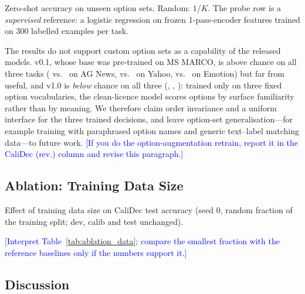 \documentclass[twocolumn]{ICCKjournal}
\newcommand{\revnote}[1]{\textcolor{blue}{[#1]}}
\begin{document}
\begin{table}[H]
\caption{Zero-shot accuracy on unseen option sets. Random: $1/K$. The probe row is a \emph{supervised} reference: a logistic regression on frozen 1-pass-encoder features trained on 300 labelled examples per task.}
\label{tab:custom}
\centering
\small
\begin{adjustbox}{max width=\linewidth}

\end{adjustbox}
\end{table}

The results do not support custom option sets as a capability of the released models. v0.1, whose base was pre-trained on MS MARCO, is above chance on all three tasks (\CustAgnewsVZero{} vs.\ \CustAgnewsRand{} on AG News, \CustYahooVZero{} vs.\ \CustYahooRand{} on Yahoo, \CustEmotionVZero{} vs.\ \CustEmotionRand{} on Emotion) but far from useful, and v1.0 is \emph{below} chance on all three (\CustAgnewsVOne{}, \CustYahooVOne{}, \CustEmotionVOne{}): trained only on three fixed option vocabularies, the clean-licence model scores options by surface familiarity rather than by meaning. We therefore claim order invariance and a uniform interface for the three trained decisions, and leave option-set generalisation---for example training with paraphrased option names and generic text--label matching data---to future work. \revnote{If you do the option-augmentation retrain, report it in the CaliDec (rev.) column and revise this paragraph.}

\subsection{Ablation: Training Data Size}
\label{sec:ablation_data}
\begin{table}[H]
\caption{Effect of training data size on CaliDec test accuracy (seed 0, random fraction of the training split; dev, calib and test unchanged).}
\label{tab:ablation_data}
\centering
\small
\begin{adjustbox}{max width=\linewidth}

\end{adjustbox}
\end{table}

\revnote{Interpret Table~\ref{tab:ablation_data}; compare the smallest fraction with the reference baselines only if the numbers support it.}

\subsection{Discussion}
\label{sec:discussion}
\end{document}
